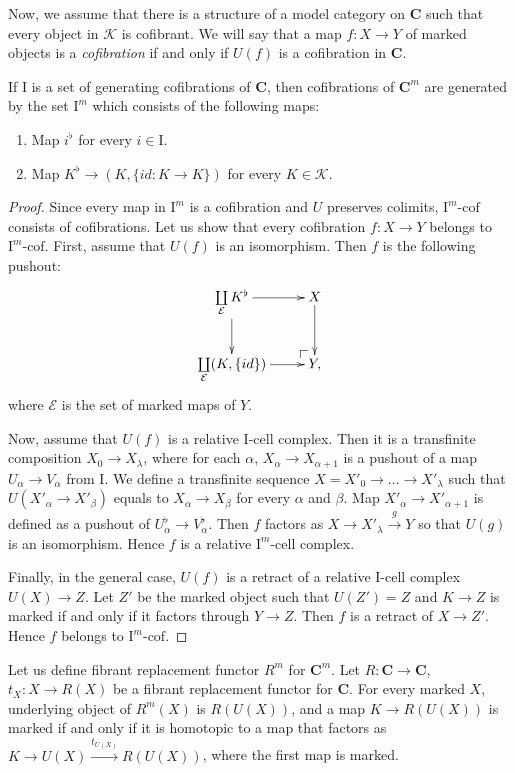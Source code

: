 \documentclass[reqno]{amsart}
\makeatletter
\theoremstyle{definition}
\theoremstyle{remark}
\newcommand{\cat}[1]{\mathbf{#1}}
\newcommand{\C}{\cat{C}}
\newcommand{\I}{\mathrm{I}}
\newcommand{\class}[2]{#1\text{-}\mathrm{#2}}
\newcommand{\Icell}[1][\I]{\class{#1}{cell}}
\newcommand{\Icof}[1][\I]{\class{#1}{cof}}
\numberwithin{figure}{section}
\newcommand{\po}[1][dr]{\save*!/#1+1.2pc/#1:(1,-1)@^{|-}\restore}
\makeatother
\begin{document}
Now, we assume that there is a structure of a model category on $\C$ such that every object in $\mathcal{K}$ is cofibrant.
We will say that a map $f : X \to Y$ of marked objects is a \emph{cofibration} if and only if $U(f)$ is a cofibration in $\C$. 
\begin{prop}
If $\I$ is a set of generating cofibrations of $\C$, then cofibrations of $\C^m$ are generated by the set $\I^m$ which consists of the following maps:
\begin{enumerate}
\item Map $i^\flat$ for every $i \in \I$.
\item Map $K^\flat \to (K,\{ id : K \to K \})$ for every $K \in \mathcal{K}$.
\end{enumerate}
\end{prop}
\begin{proof}
Since every map in $\I^m$ is a cofibration and $U$ preserves colimits, $\Icof[\I^m]$ consists of cofibrations.
Let us show that every cofibration $f : X \to Y$ belongs to $\Icof[\I^m]$.
First, assume that $U(f)$ is an isomorphism.
Then $f$ is the following pushout:
\[ \xymatrix{ \coprod\limits_\mathcal{E} K^\flat \ar[r] \ar[d] & X \ar[d] \\
              \coprod\limits_\mathcal{E} (K,\{id\}) \ar[r] & \po Y,
            } \]
where $\mathcal{E}$ is the set of marked maps of $Y$.

Now, assume that $U(f)$ is a relative $\Icell$ complex.
Then it is a transfinite composition $X_0 \to X_\lambda$, where for each $\alpha$, $X_\alpha \to X_{\alpha+1}$ is a pushout of a map $U_\alpha \to V_\alpha$ from $\I$.
We define a transfinite sequence $X = X'_0 \to \ldots \to X'_\lambda$ such that $U(X'_\alpha \to X'_\beta)$ equals to $X_\alpha \to X_\beta$ for every $\alpha$ and $\beta$.
Map $X'_\alpha \to X'_{\alpha+1}$ is defined as a pushout of $U^\flat_\alpha \to V^\flat_\alpha$.
Then $f$ factors as $X \to X'_\lambda \xrightarrow{g} Y$ so that $U(g)$ is an isomorphism.
Hence $f$ is a relative $\Icell[\I^m]$ complex.

Finally, in the general case, $U(f)$ is a retract of a relative $\Icell$ complex $U(X) \to Z$.
Let $Z'$ be the marked object such that $U(Z') = Z$ and $K \to Z$ is marked if and only if it factors through $Y \to Z$.
Then $f$ is a retract of $X \to Z'$.
Hence $f$ belongs to $\Icof[\I^m]$.
\end{proof}

Let us define fibrant replacement functor $R^m$ for $\C^m$.
Let $R : \C \to \C$, $t_X : X \to R(X)$ be a fibrant replacement functor for $\C$.
For every marked $X$, underlying object of $R^m(X)$ is $R(U(X))$, and a map $K \to R(U(X))$ is marked if and only if
it is homotopic to a map that factors as $K \to U(X) \xrightarrow{t_{U(X)}} R(U(X))$, where the first map is marked.
\end{document}
